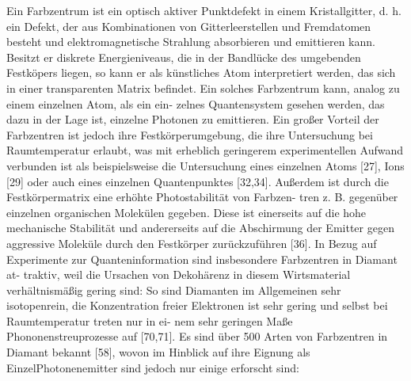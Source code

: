   Ein Farbzentrum ist ein optisch aktiver Punktdefekt in einem Kristallgitter, d. h. ein Defekt, der aus Kombinationen von Gitterleerstellen und Fremdatomen besteht und elektromagnetische Strahlung absorbieren und emittieren kann. Besitzt er diskrete Energieniveaus, die in der Bandlücke des umgebenden Festköpers liegen, so kann er als künstliches Atom interpretiert werden, das sich in einer transparenten Matrix befindet. Ein solches Farbzentrum kann, analog zu einem einzelnen Atom, als ein ein- zelnes Quantensystem gesehen werden, das dazu in der Lage ist, einzelne Photonen zu emittieren. Ein großer Vorteil der Farbzentren ist jedoch ihre Festkörperumgebung, die ihre Untersuchung bei Raumtemperatur erlaubt, was mit erheblich geringerem experimentellen Aufwand verbunden ist als beispielsweise die Untersuchung eines einzelnen Atoms [27], Ions [29] oder auch eines einzelnen Quantenpunktes [32,34]. Außerdem ist durch die Festkörpermatrix eine erhöhte Photostabilität von Farbzen- tren z. B. gegenüber einzelnen organischen Molekülen gegeben. Diese ist einerseits auf die hohe mechanische Stabilität und andererseits auf die Abschirmung der Emitter gegen aggressive Moleküle durch den Festkörper zurückzuführen [36]. In Bezug auf Experimente zur Quanteninformation sind insbesondere Farbzentren in Diamant at- traktiv, weil die Ursachen von Dekohärenz in diesem Wirtsmaterial verhältnismäßig gering sind: So sind Diamanten im Allgemeinen sehr isotopenrein, die Konzentration freier Elektronen ist sehr gering und selbst bei Raumtemperatur treten nur in ei- nem sehr geringen Maße Phononenstreuprozesse auf [70,71]. Es sind über 500 Arten von Farbzentren in Diamant bekannt [58], wovon im Hinblick auf ihre Eignung als EinzelPhotonenemitter sind jedoch nur einige erforscht sind:

